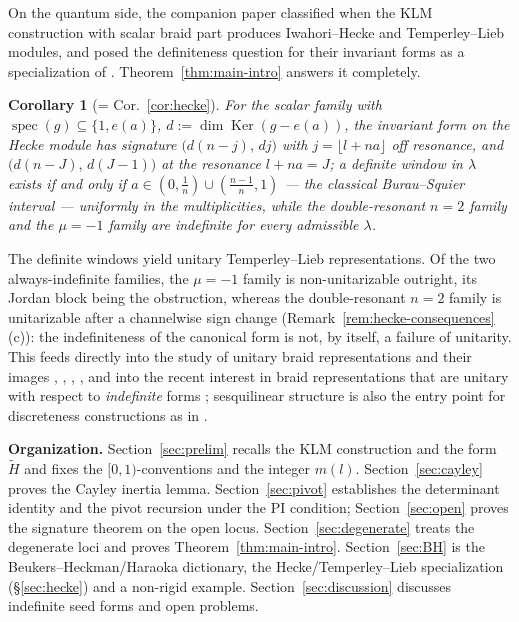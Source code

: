 \documentclass[11pt]{article}
\newtheorem{corollary}[theorem]{Corollary}
\theoremstyle{definition}
\newcommand{\Ht}{\widetilde H}
\newcommand{\Ker}{\operatorname{Ker}}
\newcommand{\e}[1]{e\!\left(#1\right)}   %
\begin{document}
On the quantum side, the companion paper \cite{N-Hecke} classified when the
KLM construction with scalar braid part produces Iwahori--Hecke and
Temperley--Lieb modules, and posed the definiteness question for
their invariant forms as a specialization of \cite[Problem~18]{N-KLM}.
Theorem~\ref{thm:main-intro} answers it completely.

\begin{corollary}[= Cor.~\ref{cor:hecke}]
\label{cor:hecke-intro}
For the scalar family with $\operatorname{spec}(g)\subseteq\{1,\e a\}$,
$d:=\dim\Ker(g-\e a)$, the invariant form on the Hecke module has
signature $\bigl(d(n-j),\,dj\bigr)$ with $j=\lfloor l+na\rfloor$ off
resonance, and $\bigl(d(n-J),\,d(J-1)\bigr)$ at the resonance
$l+na=J$; a definite window in $\lambda$ exists if and only if
$a\in(0,\tfrac1n)\cup(\tfrac{n-1}n,1)$ --- the classical
Burau--Squier interval --- uniformly in the multiplicities, while the
double-resonant $n=2$ family and the $\mu=-1$ family are indefinite
for every admissible $\lambda$.
\end{corollary}

The definite windows yield unitary Temperley--Lieb representations.
Of the two always-indefinite families, the $\mu=-1$ family is
non-unitarizable outright, its Jordan block being the obstruction,
whereas the double-resonant $n=2$ family is unitarizable after a
channelwise sign change (Remark~\ref{rem:hecke-consequences}(c)): the
indefiniteness of the canonical form is not, by itself, a failure of
unitarity. This feeds directly into the study of
unitary braid representations and their images \cite{Jones}, \cite{Wenzl},
\cite{FLW}, \cite{LR}, and into the recent interest in braid representations
that are unitary with respect to \emph{indefinite} forms \cite{GLPS};
sesquilinear structure is also the entry point for discreteness
constructions as in \cite{Scherich}.


\medskip\noindent
\textbf{Organization.} Section~\ref{sec:prelim} recalls the KLM
construction and the form $\Ht$ and fixes the $[0,1)$-conventions and
the integer $m(l)$. Section~\ref{sec:cayley} proves the Cayley
inertia lemma. Section~\ref{sec:pivot} establishes the
determinant identity and the pivot recursion under the PI condition;
Section~\ref{sec:open} proves the signature theorem on the open
locus. Section~\ref{sec:degenerate} treats the degenerate loci and
proves Theorem~\ref{thm:main-intro}. Section~\ref{sec:BH} is the
Beukers--Heckman/Haraoka dictionary, the Hecke/Temperley--Lieb
specialization (\S\ref{sec:hecke}) and a non-rigid example.
Section~\ref{sec:discussion} discusses indefinite seed forms and open
problems.
\end{document}
